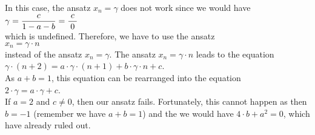 \begin{enumerate}
\begin{enumerate}
            In this case, the ansatz $x_n = \gamma$ does not work since we would have
            \\[0.2cm]
            \hspace*{1.3cm}
            $\displaystyle \gamma = \frac{c}{1 - a - b} = \frac{\;c\;}{0}$
            \\[0.2cm]
            which is undefined.  Therefore, we have to use the ansatz
            \\[0.2cm]
            \hspace*{1.3cm}
            $x_n = \gamma \cdot n$           
            \\[0.2cm]
            instead of the ansatz $x_n = \gamma$.  The ansatz $x_n = \gamma \cdot n$ leads to the equation
            \\[0.2cm]
            \hspace*{1.3cm}
            $\gamma \cdot (n+2) = a \cdot \gamma \cdot (n+1) + b \cdot \gamma \cdot n + c$.
            \\[0.2cm]
            As $a + b = 1$, this equation can be rearranged into the equation
            \\[0.2cm]
            \hspace*{1.3cm}
            $2 \cdot \gamma = a \cdot \gamma + c$.
            \\[0.2cm]
            If $a = 2$ and $c \not= 0$, then our ansatz fails.  Fortunately, this cannot happen as then
            $b = -1$ (remember we have $a + b = 1$) and the we would have $4 \cdot b + a^2 = 0$,
            which have already ruled out.


\end{enumerate}
\end{enumerate}
